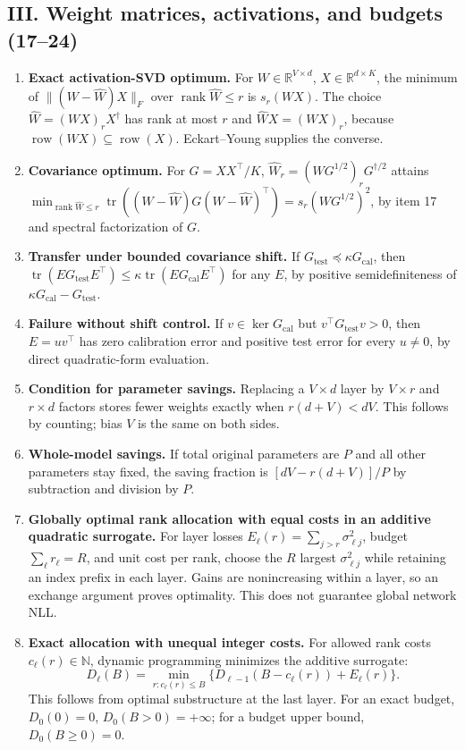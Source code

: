 \documentclass[11pt,a4paper,oneside]{book}
\newcommand{\R}{\mathbb R}\newcommand{\C}{\mathbb C}\newcommand{\Z}{\mathbb Z}\newcommand{\N}{\mathbb N}\newcommand{\Q}{\mathbb Q}
\DeclareMathOperator{\rank}{rank}\DeclareMathOperator{\Tr}{Tr}
\begin{document}
\subsection*{III. Weight matrices, activations, and budgets (17--24)}
\begin{enumerate}[start=17]
\item \textbf{Exact activation-SVD optimum.} For $W\in\R^{V\times d}$, $X\in\R^{d\times K}$, the minimum of $\|(W-\widehat W)X\|_F$ over $\rank\widehat W\le r$ is $s_r(WX)$. The choice $\widehat W=(WX)_rX^\dagger$ has rank at most $r$ and $\widehat WX=(WX)_r$, because $\operatorname{row}(WX)\subseteq\operatorname{row}(X)$. Eckart--Young supplies the converse.
\item \textbf{Covariance optimum.} For $G=XX^\top/K$, $\widehat W_r=(WG^{1/2})_rG^{\dagger/2}$ attains $\min_{\rank\widehat W\le r}\operatorname{tr}((W-\widehat W)G(W-\widehat W)^\top)=s_r(WG^{1/2})^2$, by item 17 and spectral factorization of $G$.
\item \textbf{Transfer under bounded covariance shift.} If $G_{\mathrm{test}}\preceq\kappa G_{\mathrm{cal}}$, then $\operatorname{tr}(EG_{\mathrm{test}}E^\top)\le\kappa\operatorname{tr}(EG_{\mathrm{cal}}E^\top)$ for any $E$, by positive semidefiniteness of $\kappa G_{\mathrm{cal}}-G_{\mathrm{test}}$.
\item \textbf{Failure without shift control.} If $v\in\ker G_{\mathrm{cal}}$ but $v^\top G_{\mathrm{test}}v>0$, then $E=uv^\top$ has zero calibration error and positive test error for every $u\ne0$, by direct quadratic-form evaluation.
\item \textbf{Condition for parameter savings.} Replacing a $V\times d$ layer by $V\times r$ and $r\times d$ factors stores fewer weights exactly when $r(d+V)<dV$. This follows by counting; bias $V$ is the same on both sides.
\item \textbf{Whole-model savings.} If total original parameters are $P$ and all other parameters stay fixed, the saving fraction is $[dV-r(d+V)]/P$ by subtraction and division by $P$.
\item \textbf{Globally optimal rank allocation with equal costs in an additive quadratic surrogate.} For layer losses $E_\ell(r)=\sum_{j>r}\sigma_{\ell j}^2$, budget $\sum_\ell r_\ell=R$, and unit cost per rank, choose the $R$ largest $\sigma_{\ell j}^2$ while retaining an index prefix in each layer. Gains are nonincreasing within a layer, so an exchange argument proves optimality. This does not guarantee global network NLL.
\item \textbf{Exact allocation with unequal integer costs.} For allowed rank costs $c_\ell(r)\in\N$, dynamic programming minimizes the additive surrogate:
\[D_\ell(B)=\min_{r:c_\ell(r)\le B}\{D_{\ell-1}(B-c_\ell(r))+E_\ell(r)\}.\]
This follows from optimal substructure at the last layer. For an exact budget, $D_0(0)=0$, $D_0(B>0)=+\infty$; for a budget upper bound, $D_0(B\ge0)=0$.
\end{enumerate}
\end{document}
